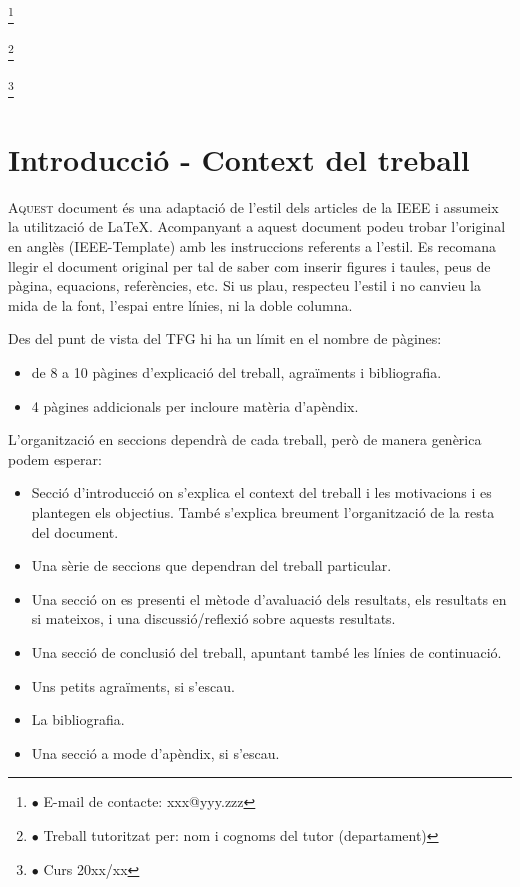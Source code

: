 ﻿\documentclass[10pt,a4paper,twocolumn,twoside]{article}
\newcommand\blfootnote[1]{%
  \begingroup
  \renewcommand\thefootnote{}\footnote{#1}%
  \addtocounter{footnote}{-1}%
  \endgroup
}
\begin{document}
\blfootnote{$\bullet$ E-mail de contacte: xxx@yyy.zzz}
\blfootnote{$\bullet$ Treball tutoritzat per: nom i cognoms del
tutor (departament)} \blfootnote{$\bullet$ Curs 20xx/xx}

\section{Introducció - Context del treball}

\lettrine[lines=3]{A}{quest} document és una adaptació  de l'estil dels articles de la IEEE i assumeix la utilització de LaTeX. Acompanyant a aquest document podeu trobar l'original en anglès (IEEE-Template) amb les instruccions referents a l'estil. Es recomana llegir el document original per tal de saber com inserir figures i taules, peus de pàgina, equacions, referències, etc. Si us plau, respecteu l'estil i no canvieu la mida de la font, l'espai entre línies, ni la doble columna.

Des del punt de vista del TFG hi ha un límit en el nombre de pàgines:

\begin{itemize}
\item de 8 a 10 pàgines d’explicació del treball, agraïments i bibliografia.
\item 4 pàgines addicionals per incloure matèria d’apèndix.
\end{itemize}

L'organització en seccions dependrà de cada treball, però de manera genèrica podem esperar:

\begin{itemize}
\item Secció d’introducció on s’explica el context del treball i les motivacions i es plantegen els objectius. També s’explica breument l’organització de la resta del document.
\item Una sèrie de seccions que dependran del treball particular.
\item Una secció on es presenti el mètode d’avaluació dels resultats, els resultats en si mateixos, i una discussió/reflexió sobre aquests resultats.
\item Una secció de conclusió del treball, apuntant també les línies de continuació.
\item Uns petits agraïments, si s’escau.
\item La bibliografia.
\item Una secció a mode d’apèndix, si s’escau.
\end{itemize}
\end{document}
